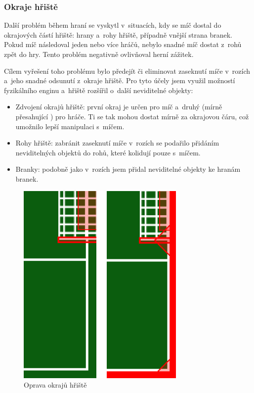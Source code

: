 \documentclass[thesis=B,czech,hidelinks]{FITthesis}[2012/06/26] %
\begin{document}
\subsubsection{Okraje hřiště}

Další problém během hraní se vyskytl v~situacích, kdy se míč dostal do okrajových částí hřiště: hrany a~rohy hřiště, případně vnější strana branek. Pokud míč následoval jeden nebo více hráčů, nebylo snadné míč dostat z~rohů zpět do hry. Tento problém negativně ovlivňoval herní zážitek.

Cílem vyřešení toho problému bylo předejít či eliminovat zaseknutí míče v~rozích a~jeho snadné odsunutí z~okraje hřiště. Pro tyto účely jsem využil možností fyzikálního enginu a~hřiště rozšířil o~další neviditelné objekty:

\begin{itemize}
	\item Zdvojení okrajů hřiště: první okraj je určen pro míč a~druhý (mírně přesahující ) pro hráče. Ti se tak mohou dostat mírně za okrajovou čáru, což umožnilo lepší manipulaci s~míčem.
	\item Rohy hřiště: zabránit zaseknutí míče v~rozích se podařilo přidáním neviditelných objektů do rohů, které kolidují pouze s~míčem.
	\item Branky: podobně jako v~rozích jsem přidal neviditelné objekty ke hranám branek.
\end{itemize}

\begin{figure}[h]
\center
\includegraphics[width=\textwidth/2]{corners}
\caption{Oprava okrajů hřiště}
\label{picture:corners}
\end{figure}
\end{document}
